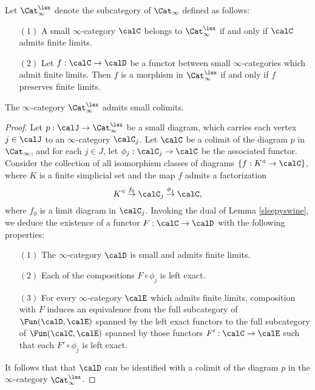 \begin{definition}
Let $\Cat_{\infty}^{\lex}$ denote the subcategory of $\Cat_{\infty}$ defined as follows:
\begin{itemize}
\item[$(1)$] A small $\infty$-category $\calC$ belongs to $\Cat_{\infty}^{\lex}$ if and only if
$\calC$ admits finite limits.
\item[$(2)$] Let $f: \calC \rightarrow \calD$ be a functor between small $\infty$-categories which admit finite limits. Then $f$ is a morphism in $\Cat_{\infty}^{\lex}$ if and only if $f$ preserves finite limits.
\end{itemize}
\end{definition}

\begin{lemma}\label{pugswell}
The $\infty$-category $\Cat_{\infty}^{\lex}$ admits small colimits. 
\end{lemma}

\begin{proof}
Let $p: \calJ \rightarrow \Cat_{\infty}^{\lex}$ be a small diagram, which carries each
vertex $j \in \calJ$ to an $\infty$-category $\calC_{j}$.
Let $\calC$ be a colimit of the diagram $p$ in $\Cat_{\infty}$, and for each
$j \in J$, let $\phi_{j}: \calC_{j} \rightarrow \calC$ be the associated functor.
Consider the collection of all isomorphism classes of diagrams $\{ f: K^{\triangleleft} \rightarrow \calC \}$, where $K$ is a finite simplicial set and the map $f$ admits a factorization
$$ K^{\triangleleft} \stackrel{f_0}{\rightarrow} \calC_{j} \stackrel{\phi_{j}}{\rightarrow} \calC,$$
where $f_0$ is a limit diagram in $\calC_{j}$. Invoking the dual of Lemma \ref{sleepyswine}, we deduce the existence of a functor $F: \calC \rightarrow \calD$ with the following properties:
\begin{itemize}
\item[$(1)$] The $\infty$-category $\calD$ is small and admits finite limits.
\item[$(2)$] Each of the compositions $F \circ \phi_{j}$ is left exact.
\item[$(3)$] For every $\infty$-category $\calE$ which admits finite limits, composition with
$F$ induces an equivalence from the full subcategory of $\Fun(\calD, \calE)$ spanned by the left exact functors to the full subcategory of $\Fun( \calC, \calE)$ spanned by those functors $F': \calC \rightarrow \calE$ such that each $F' \circ \phi_{j}$ is left exact.
\end{itemize}
It follows that that $\calD$ can be identified with a colimit of the diagram $p$ in
the $\infty$-category $\Cat_{\infty}^{\lex}$.
\end{proof}

